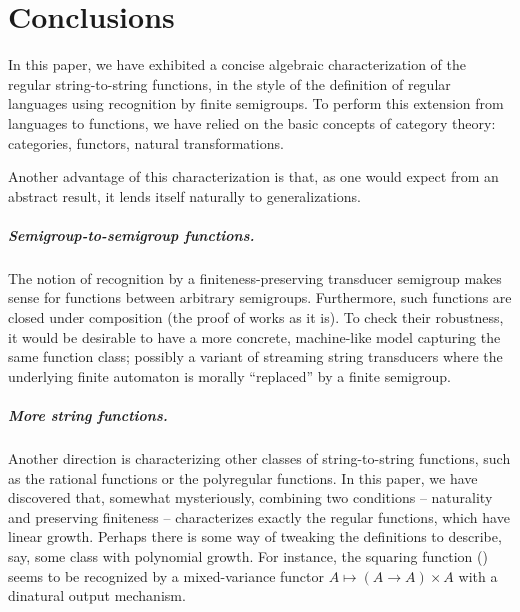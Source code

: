\section{Conclusions}\label{sec:conclusion}

In this paper, we have exhibited a concise algebraic characterization of the
regular string-to-string functions, in the style of the definition of regular
languages using recognition by finite semigroups. To perform this extension from
languages to functions, we have relied on the basic concepts of category theory:
categories, functors, natural transformations.

Another advantage of this characterization is that, as one would expect from an
abstract result, it lends itself naturally to generalizations.

\subparagraph{Semigroup-to-semigroup functions.}

The notion of recognition by a finiteness-preserving transducer semigroup makes
sense for functions between arbitrary semigroups. Furthermore, such functions
are closed under composition (the proof of  works as it
is). To check their robustness, it would be desirable to have a more concrete,
machine-like model capturing the same function class; possibly a variant of
streaming string transducers where the underlying finite automaton is morally
\enquote{replaced} by a finite semigroup.

\subparagraph{More string functions.} Another direction is
characterizing other classes of string-to-string functions, such as the rational
functions or the polyregular functions. In this paper, we have discovered that,
somewhat mysteriously, combining two conditions -- naturality and preserving
finiteness -- characterizes exactly the regular functions, which have linear
growth. Perhaps there is some way of tweaking the definitions to describe, say, some class with polynomial growth. For instance, the squaring function
() seems to be recognized by a mixed-variance functor
$A \mapsto (A \to A) \times A$ with a dinatural output mechanism.

